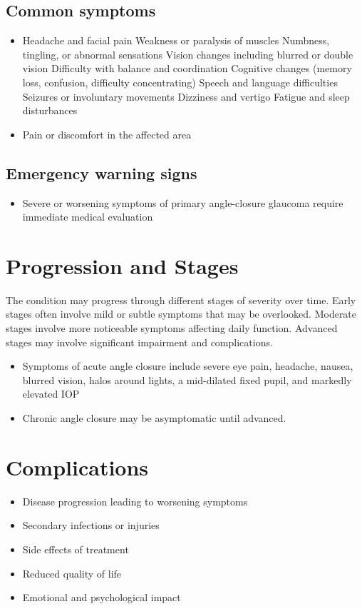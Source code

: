 \subsection{Common symptoms}
\begin{itemize}[noitemsep]
  \item Headache and facial pain Weakness or paralysis of muscles Numbness, tingling, or abnormal sensations Vision changes including blurred or double vision Difficulty with balance and coordination Cognitive changes (memory loss, confusion, difficulty concentrating) Speech and language difficulties Seizures or involuntary movements Dizziness and vertigo Fatigue and sleep disturbances
  \item Pain or discomfort in the affected area
  \end{itemize}
\subsection{Emergency warning signs}
\begin{itemize}[noitemsep]
  \item Severe or worsening symptoms of primary angle-closure glaucoma require immediate medical evaluation
\end{itemize}
\section{Progression and Stages}
The condition may progress through different stages of severity over time. Early stages often involve mild or subtle symptoms that may be overlooked. Moderate stages involve more noticeable symptoms affecting daily function. Advanced stages may involve significant impairment and complications.

\begin{itemize}[noitemsep]
  \item Symptoms of acute angle closure include severe eye pain, headache, nausea, blurred vision, halos around lights, a mid-dilated fixed pupil, and markedly elevated IOP
  \item Chronic angle closure may be asymptomatic until advanced.
\end{itemize}
\section{Complications}
\begin{itemize}[noitemsep]
  \item Disease progression leading to worsening symptoms
  \item Secondary infections or injuries
  \item Side effects of treatment
  \item Reduced quality of life
  \item Emotional and psychological impact
\end{itemize}

